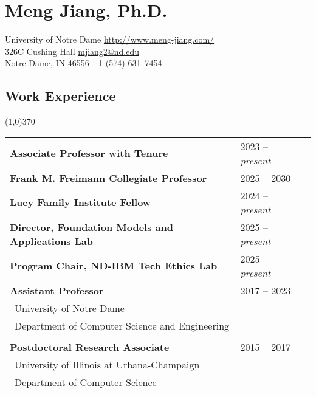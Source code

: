 \documentclass[10pt]{article}
\begin{document}
\setcounter{secnumdepth}{0}

\thispagestyle{firststyle}

\section{\LARGE{\sc Meng Jiang, Ph.D.}}
University of Notre Dame \hfill \url{http://www.meng-jiang.com/} \\
326C Cushing Hall \hfill \url{mjiang2@nd.edu}\\
Notre Dame, IN 46556 \hfill +1 (574) 631--7454

\subsection{\sc Work Experience}
\vspace{-0.4cm} \line(1,0){370} \vspace{0.1cm}

\begin{table}[h!]
\begin{tabular*}{12.7cm}{p{10.0cm}p{3.25cm}r}
\bf{Associate Professor with Tenure}&2023 -- \emph{present}\\
\bf{Frank M. Freimann Collegiate Professor}&2025 -- 2030\\
\bf{Lucy Family Institute Fellow}&2024 -- \emph{present}\\
\bf{Director, Foundation Models and Applications Lab}&2025 -- \emph{present}\\
\bf{Program Chair, ND-IBM Tech Ethics Lab}&2025 -- \emph{present}\\
\bf{Assistant Professor}&2017 -- 2023\\
 \multicolumn{2}{l}{~{University of Notre Dame}}\\
 \multicolumn{2}{l}{~{Department of Computer Science and Engineering}}\\
\\
\bf{Postdoctoral Research Associate}&2015 -- 2017\\
 \multicolumn{2}{l}{~{University of Illinois at Urbana-Champaign}}\\
 \multicolumn{2}{l}{~{Department of Computer Science}} \\
\end{tabular*}
\end{table}
\vspace{-0.4cm}

\vspace{-0.2cm}
\end{document}
